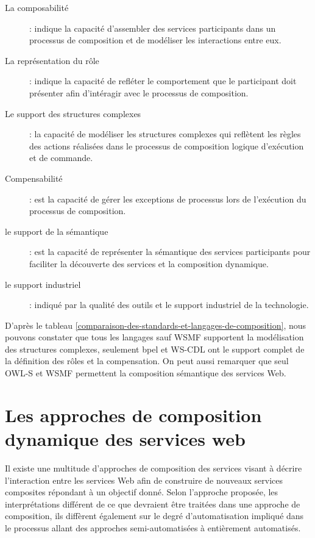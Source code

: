  \renewcommand{\descriptionlabel}[1]{\hspace{0.5cm}\textbullet~\textsf{#1}}
  \begin{description}
  \item [La composabilité]: indique la capacité d'assembler des
    services participants dans un processus de composition et de
    modéliser les interactions entre eux.

  \item [La représentation du rôle]: indique la capacité de refléter
    le comportement que le participant doit présenter afin d'intéragir
    avec le processus de composition.

  \item [Le support des structures complexes]: la capacité de
    modéliser les structures complexes qui reflètent les règles des
    actions réalisées dans le processus de composition logique
    d'exécution et de commande.

  \item [Compensabilité]: est la capacité de gérer les exceptions de
    processus lors de l'exécution du processus de composition.

  \item [le support de la sémantique]: est la capacité de représenter la
    sémantique des services participants pour faciliter la découverte
    des services et la composition dynamique.

  \item [le support industriel]: indiqué par la qualité des outils et
    le support industriel de la technologie.
  \end{description}
  \enddescription

  D'après le tableau
  \ref{comparaison-des-standards-et-langages-de-composition}, nous
  pouvons constater que tous les langages sauf \textsc{WSMF}
  supportent la modélisation des structures complexes, seulement
  \acrshort{bpel} et \textsc{WS-CDL} ont le support complet de la
  définition des rôles et la compensation. On peut aussi remarquer que
  seul \textsc{OWL-S} et \textsc{WSMF} permettent la
  composition sémantique des services Web.

  \section{Les approches de composition dynamique des services web}
  \label{sec:comp-dynam}
  Il existe une multitude d'approches de composition des
  services visant à décrire l'interaction entre les services Web afin de
  construire de nouveaux services composites répondant à un objectif donné.
  Selon l'approche proposée, les interprétations différent de ce que devraient être
  traitées dans une approche de composition, ils diffèrent également
  sur le degré d'automatisation impliqué dans le processus allant des
  approches semi-automatisées à entièrement automatisés.\medskip

